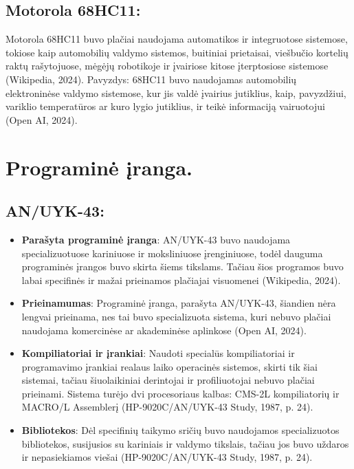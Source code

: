 \documentclass[a4paper,12pt]{article}
\begin{document}
\subsection{Motorola 68HC11:}
Motorola 68HC11 buvo plačiai naudojama automatikos ir integruotose sistemose, tokiose kaip automobilių valdymo sistemos, buitiniai prietaisai, viešbučio kortelių raktų rašytojuose, mėgėjų robotikoje ir įvairiose kitose įterptosiose sistemose (Wikipedia, 2024). Pavyzdys: 68HC11 buvo naudojamas automobilių elektroninėse valdymo sistemose, kur jis valdė įvairius jutiklius, kaip, pavyzdžiui, variklio temperatūros ar kuro lygio jutiklius, ir teikė informaciją vairuotojui (Open AI, 2024).

\section{Programinė įranga.}
\subsection{AN/UYK-43:}
\begin{itemize}
    \item \textbf{Parašyta programinė įranga}: AN/UYK-43 buvo naudojama specializuotuose kariniuose ir moksliniuose įrenginiuose, todėl dauguma programinės įrangos buvo skirta šiems tikslams. Tačiau šios programos buvo labai specifinės ir mažai prieinamos plačiajai visuomenei (Wikipedia, 2024).
    \item \textbf{Prieinamumas}: Programinė įranga, parašyta AN/UYK-43, šiandien nėra lengvai prieinama, nes tai buvo specializuota sistema, kuri nebuvo plačiai naudojama komercinėse ar akademinėse aplinkose (Open AI, 2024).
    \item \textbf{Kompiliatoriai ir įrankiai}: Naudoti specialūs kompiliatoriai ir programavimo įrankiai realaus laiko operacinės sistemos, skirti tik šiai sistemai, tačiau šiuolaikiniai derintojai ir profiliuotojai nebuvo plačiai prieinami. Sistema turėjo dvi procesoriaus kalbas: CMS-2L kompiliatorių ir MACRO/L Assemblerį (HP-9020C/AN/UYK-43 Study, 1987, p. 24).
    \item \textbf{Bibliotekos}: Dėl specifinių taikymo sričių buvo naudojamos specializuotos bibliotekos, susijusios su kariniais ir valdymo tikslais, tačiau jos buvo uždaros ir nepasiekiamos viešai (HP-9020C/AN/UYK-43 Study, 1987, p. 24).
\end{itemize}
\end{document}
